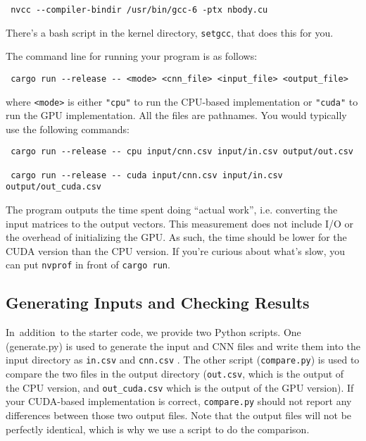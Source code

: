 \begin{verbatim}
 nvcc --compiler-bindir /usr/bin/gcc-6 -ptx nbody.cu
\end{verbatim}


There's a bash script in the kernel directory, \texttt{setgcc}, that does this for you.

The command line for running your program is as follows:


\begin{verbatim}
 cargo run --release -- <mode> <cnn_file> <input_file> <output_file>
\end{verbatim}


where \texttt{<mode>} is either \texttt{"cpu"} to run the CPU-based implementation or \texttt{"cuda"} to run the GPU implementation. All the files are pathnames. You would typically use the following commands:


\begin{verbatim}
 cargo run --release -- cpu input/cnn.csv input/in.csv output/out.csv

 cargo run --release -- cuda input/cnn.csv input/in.csv output/out_cuda.csv
\end{verbatim}


The program outputs the time spent doing ``actual work'', i.e. converting the input matrices to the output vectors.  This measurement does not include I/O or the overhead of initializing the GPU. As such, the time should be lower for the CUDA version than the CPU version. If you're curious about what's slow, you can put \texttt{nvprof} in front of \texttt{cargo run}.




\subsection*{Generating Inputs and Checking Results}




In\ addition\ to the starter code, we provide two Python scripts. One (generate.py) is  used to generate the input and CNN files and write them into the input directory as \texttt{in.csv}  and \texttt{cnn.csv} .  The other script (\texttt{compare.py}) is used to compare the two files in the output directory (\texttt{out.csv}, which is the output of the CPU version, and \texttt{out\_cuda.csv}  which is the output of the GPU version). If your CUDA-based implementation is correct, \texttt{compare.py} should not report any differences between those two output files. Note that the output files will not be perfectly identical, which is why we use a script to do the comparison.


